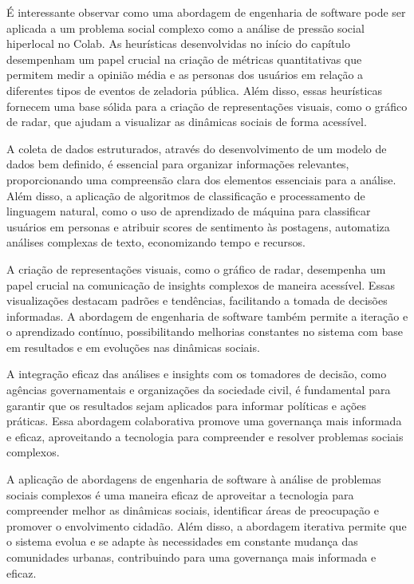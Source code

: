 É interessante observar como uma abordagem de engenharia de software pode ser aplicada a um problema social complexo como a análise de pressão social hiperlocal no Colab. As heurísticas desenvolvidas no início do capítulo desempenham um papel crucial na criação de métricas quantitativas que permitem medir a opinião média e as personas dos usuários em relação a diferentes tipos de eventos de zeladoria pública. Além disso, essas heurísticas fornecem uma base sólida para a criação de representações visuais, como o gráfico de radar, que ajudam a visualizar as dinâmicas sociais de forma acessível.

A coleta de dados estruturados, através do desenvolvimento de um modelo de dados bem definido, é essencial para organizar informações relevantes, proporcionando uma compreensão clara dos elementos essenciais para a análise. Além disso, a aplicação de algoritmos de classificação e processamento de linguagem natural, como o uso de aprendizado de máquina para classificar usuários em personas e atribuir scores de sentimento às postagens, automatiza análises complexas de texto, economizando tempo e recursos.

A criação de representações visuais, como o gráfico de radar, desempenha um papel crucial na comunicação de insights complexos de maneira acessível. Essas visualizações destacam padrões e tendências, facilitando a tomada de decisões informadas. A abordagem de engenharia de software também permite a iteração e o aprendizado contínuo, possibilitando melhorias constantes no sistema com base em resultados e em evoluções nas dinâmicas sociais.

A integração eficaz das análises e insights com os tomadores de decisão, como agências governamentais e organizações da sociedade civil, é fundamental para garantir que os resultados sejam aplicados para informar políticas e ações práticas. Essa abordagem colaborativa promove uma governança mais informada e eficaz, aproveitando a tecnologia para compreender e resolver problemas sociais complexos.

A aplicação de abordagens de engenharia de software à análise de problemas sociais complexos é uma maneira eficaz de aproveitar a tecnologia para compreender melhor as dinâmicas sociais, identificar áreas de preocupação e promover o envolvimento cidadão. Além disso, a abordagem iterativa permite que o sistema evolua e se adapte às necessidades em constante mudança das comunidades urbanas, contribuindo para uma governança mais informada e eficaz.

